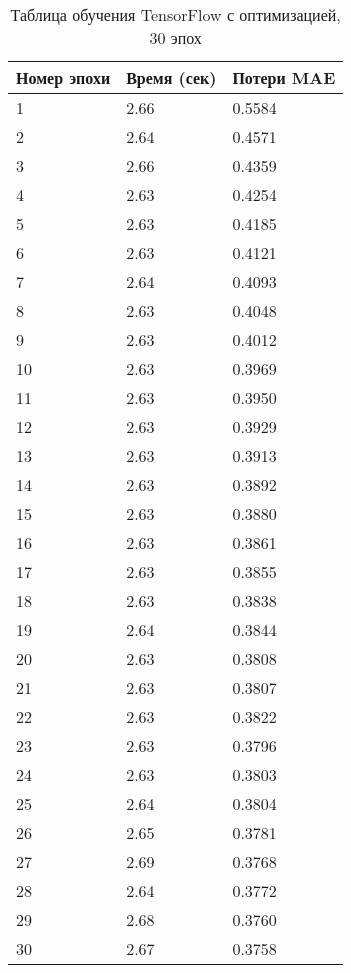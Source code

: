 \documentclass[a4paper,12pt,titlepage,final]{article}
\begin{document}
\begin{table}[H]
\centering
\begin{tabular}{|p{6.4cm}|p{3.2cm}|p{3.2cm}|}
\hline
Номер эпохи & Время (сек) & Потери MAE\\
\hline
1 & 2.66 & 0.5584 \\ [1.5ex]
\hline
2 & 2.64 & 0.4571 \\ [1.5ex]
\hline
3 & 2.66 & 0.4359 \\ [1.5ex]
\hline
4 & 2.63 & 0.4254 \\ [1.5ex]
\hline
5 & 2.63 & 0.4185 \\ [1.5ex]
\hline
6 & 2.63 & 0.4121 \\ [1.5ex]
\hline
7 & 2.64 & 0.4093 \\ [1.5ex]
\hline
8 & 2.63 & 0.4048 \\ [1.5ex]
\hline
9 & 2.63 & 0.4012 \\ [1.5ex]
\hline
10 & 2.63 & 0.3969 \\ [1.5ex]
\hline
11 & 2.63 & 0.3950 \\ [1.5ex]
\hline
12 & 2.63 & 0.3929 \\ [1.5ex]
\hline
13 & 2.63 & 0.3913 \\ [1.5ex]
\hline
14 & 2.63 & 0.3892 \\ [1.5ex]
\hline
15 & 2.63 & 0.3880 \\ [1.5ex]
\hline
16 & 2.63 & 0.3861 \\ [1.5ex]
\hline
17 & 2.63 & 0.3855 \\ [1.5ex]
\hline
18 & 2.63 & 0.3838 \\ [1.5ex]
\hline
19 & 2.64 & 0.3844 \\ [1.5ex]
\hline
20 & 2.63 & 0.3808 \\ [1.5ex]
\hline
21 & 2.63 & 0.3807 \\ [1.5ex]
\hline
22 & 2.63 & 0.3822 \\ [1.5ex]
\hline
23 & 2.63 & 0.3796 \\ [1.5ex]
\hline
24 & 2.63 & 0.3803 \\ [1.5ex]
\hline
25 & 2.64 & 0.3804 \\ [1.5ex]
\hline
26 & 2.65 & 0.3781 \\ [1.5ex]
\hline
27 & 2.69 & 0.3768 \\ [1.5ex]
\hline
28 & 2.64 & 0.3772 \\ [1.5ex]
\hline
29 & 2.68 & 0.3760 \\ [1.5ex]
\hline
30 & 2.67 & 0.3758 \\ [1.5ex]
\hline
\end{tabular}
\caption{Таблица обучения TensorFlow с оптимизацией, 30 эпох}
\label{gputable6}
\end{table}
\end{document}
